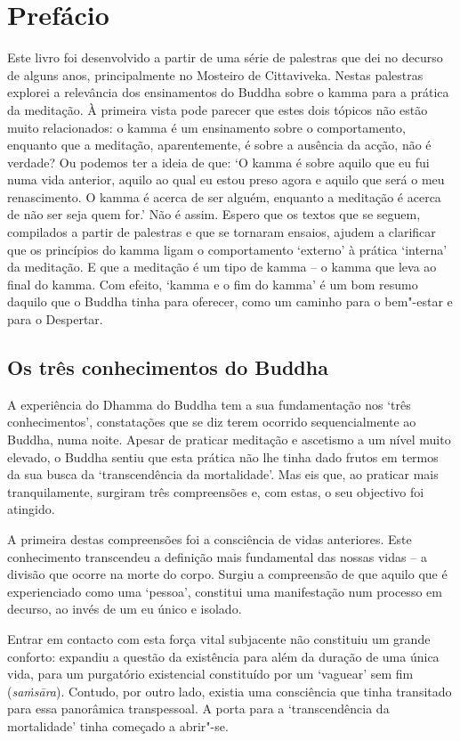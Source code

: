 \chapter{Prefácio}

Este livro foi desenvolvido a partir de uma série de palestras que dei no
decurso de alguns anos, principalmente no Mosteiro de Cittaviveka. Nestas
palestras explorei a relevância dos ensinamentos do Buddha sobre o kamma para a
prática da meditação. À primeira vista pode parecer que estes dois tópicos não
estão muito relacionados: o kamma é um ensinamento sobre o comportamento,
enquanto que a meditação, aparentemente, é sobre a ausência da acção, não é
verdade? Ou podemos ter a ideia de que: `O kamma é sobre aquilo que eu fui numa
vida anterior, aquilo ao qual eu estou preso agora e aquilo que será o meu
renascimento. O kamma é acerca de ser alguém, enquanto a meditação é acerca de
não ser seja quem for.' Não é assim. Espero que os textos que se seguem,
compilados a partir de palestras e que se tornaram ensaios, ajudem a clarificar
que os princípios do kamma ligam o comportamento `externo' à prática `interna'
da meditação. E que a meditação é um tipo de kamma -- o kamma que leva ao final
do kamma. Com efeito, `kamma e o fim do kamma' é um bom resumo daquilo que o
Buddha tinha para oferecer, como um caminho para o bem"-estar e para o Despertar.

\section{Os três conhecimentos do Buddha}

A experiência do Dhamma do Buddha tem a sua fundamentação nos `três
conhecimentos', constatações que se diz terem ocorrido sequencialmente ao
Buddha, numa noite. Apesar de praticar meditação e ascetismo a um nível muito
elevado, o Buddha sentiu que esta prática não lhe tinha dado frutos em termos da
sua busca da `transcendência da mortalidade'. Mas eis que, ao praticar mais
tranquilamente, surgiram três compreensões e, com estas, o seu objectivo foi
atingido.

A primeira destas compreensões foi a consciência de vidas anteriores. Este
conhecimento transcendeu a definição mais fundamental das nossas vidas -- a
divisão que ocorre na morte do corpo. Surgiu a compreensão de que aquilo que é
experienciado como uma `pessoa', constitui uma manifestação num processo em
decurso, ao invés de um eu único e isolado.

Entrar em contacto com esta força vital subjacente não constituiu um grande
conforto: expandiu a questão da existência para além da duração de uma única
vida, para um purgatório existencial constituído por um `vaguear' sem fim
(\emph{saṁsāra}). Contudo, por outro lado, existia uma consciência que tinha
transitado para essa panorâmica transpessoal. A porta para a `transcendência da
mortalidade' tinha começado a abrir"-se.

